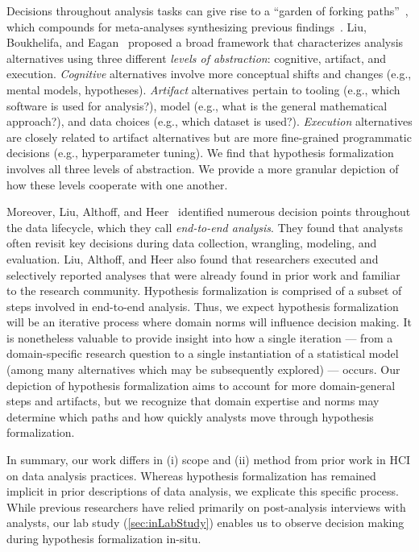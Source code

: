 Decisions throughout analysis tasks can give rise to a ``garden of forking
paths''~\cite{gelman2013garden}, which compounds for meta-analyses synthesizing
previous findings~\cite{kale2019decision}. Liu, Boukhelifa, and
Eagan~\cite{liu2019understanding} proposed a broad framework that characterizes
analysis alternatives using three different \textit{levels of abstraction}:
cognitive, artifact, and execution. \textit{Cognitive} alternatives involve more
conceptual shifts and changes (e.g., mental models, hypotheses).
\textit{Artifact} alternatives pertain to tooling (e.g., which software is used
for analysis?), model (e.g., what is the general mathematical approach?), and
data choices (e.g., which dataset is used?). \textit{Execution} alternatives are
closely related to artifact alternatives but are more fine-grained programmatic
decisions (e.g., hyperparameter tuning). We find that hypothesis formalization
involves all three levels of abstraction. We provide a more granular depiction
of how these levels cooperate with one another. 

Moreover, Liu, Althoff, and Heer~\cite{liu2019paths} identified numerous
decision points throughout the data lifecycle, which they call
\textit{end-to-end analysis}. They found that analysts often revisit key
decisions during data collection, wrangling, modeling, and evaluation. Liu,
Althoff, and Heer also found that researchers executed and selectively reported
analyses that were already found in prior work and familiar to the research
community. Hypothesis formalization is comprised of a subset of steps involved
in end-to-end analysis. Thus, we expect hypothesis formalization will be an
iterative process where domain norms will influence decision making. It is
nonetheless valuable to provide insight into how a single iteration --- from a
domain-specific research question to a single instantiation of a statistical
model (among many alternatives which may be subsequently explored) --- occurs.
Our depiction of hypothesis formalization aims to account for more
domain-general steps and artifacts, but we recognize that domain expertise and
norms may determine which paths and how quickly analysts move through hypothesis
formalization.

In summary, our work differs in (i) scope and (ii) method from prior work in HCI
on data analysis practices. Whereas hypothesis formalization has remained
implicit in prior descriptions of data analysis, we explicate
this specific process. While previous researchers have relied primarily on
post-analysis interviews with analysts, our lab study (\autoref{sec:inLabStudy}) enables us to observe
decision making during hypothesis formalization in-situ.



